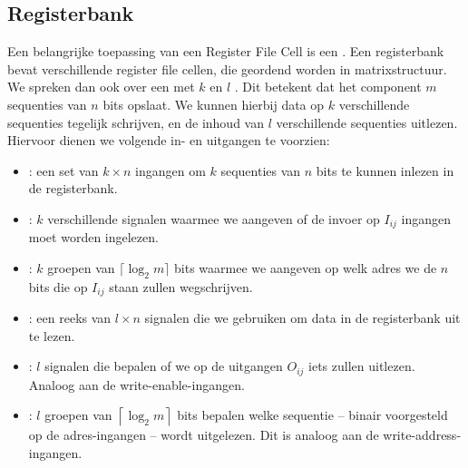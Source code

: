 \subsection{Registerbank}
Een belangrijke toepassing van een Register File Cell is een . Een registerbank bevat verschillende register file cellen, die geordend worden in matrixstructuur. We spreken dan ook over een  met $k$  en $l$ . Dit betekent dat het component $m$ sequenties van $n$ bits opslaat. We kunnen hierbij data op $k$ verschillende sequenties tegelijk schrijven, en de inhoud van $l$ verschillende sequenties uitlezen. Hiervoor dienen we volgende in- en uitgangen te voorzien:
\begin{itemize}
 \item {}: een set van $k\times n$ ingangen om $k$ sequenties van $n$ bits te kunnen inlezen in de registerbank.
 \item {}: $k$ verschillende signalen waarmee we aangeven of de invoer op $I_{ij}$ ingangen moet worden ingelezen.
 \item {}: $k$ groepen van $\lceil\log_2m\rceil$ bits waarmee we aangeven op welk adres we de $n$ bits die op $I_{ij}$ staan zullen wegschrijven.
 \item {}: een reeks van $l\times n$ signalen die we gebruiken om data in de registerbank uit te lezen.
 \item {}: $l$ signalen die bepalen of we op de uitgangen $O_{ij}$ iets zullen uitlezen. Analoog aan de write-enable-ingangen.
 \item {}: $l$ groepen van $\left\lceil\log_2m\right\rceil$ bits bepalen welke sequentie -- binair voorgesteld op de adres-ingangen -- wordt uitgelezen. Dit is analoog aan de write-address-ingangen.
\end{itemize}
